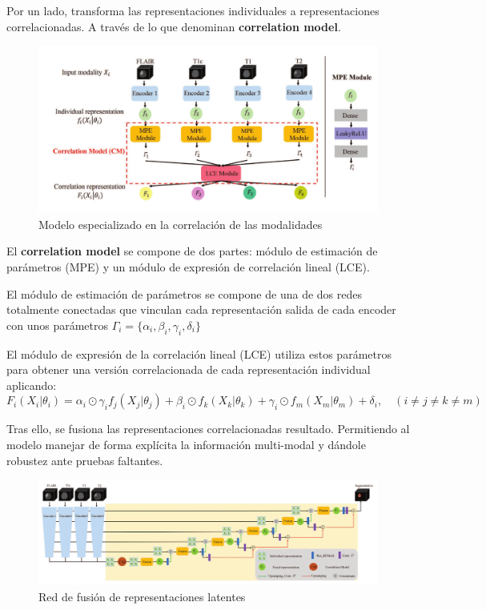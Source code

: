 		Por un lado, transforma las representaciones individuales a representaciones correlacionadas. A través de lo que denominan \textbf{correlation model}.
		
		\begin{figure}[H]
			\centering
			\includegraphics[width=0.75\linewidth]{imagenes/zhoufusionmodel.png}
			\caption{Modelo especializado en la correlación de las modalidades}
		\end{figure}
		
		El \textbf{correlation model} se compone de dos partes: módulo de estimación de parámetros (MPE) y un módulo de expresión de correlación lineal (LCE).
		
		El módulo de estimación de parámetros se compone de una de dos redes totalmente conectadas que vinculan cada representación salida de cada encoder con unos parámetros $ \Gamma_i = \{ \alpha_i , \beta_i , \gamma_i , \delta_i \}$
		
		El módulo de expresión de la correlación lineal (LCE) utiliza estos parámetros para obtener una versión correlacionada de cada representación individual aplicando: 
		$$ F_i (X_i | \theta_i ) = \alpha_i \odot \gamma_i f_j (X_j | \theta_j ) + \beta_i \odot f_k (X_k | \theta_k ) + \gamma_i \odot f_m (X_m | \theta_m ) + \delta_i , \quad (i \neq j \neq k \neq m)$$
		
		Tras ello, se fusiona las representaciones correlacionadas resultado. Permitiendo al modelo manejar de forma explícita la información multi-modal y dándole robustez ante pruebas faltantes. 
		
		\begin{figure}[H]
			\centering
			\includegraphics[width=1.1\linewidth]{imagenes/zhouarchitecture.png}
			\caption{Red \cite{zhou2021latent} de fusión de representaciones latentes}
		\end{figure}
		
